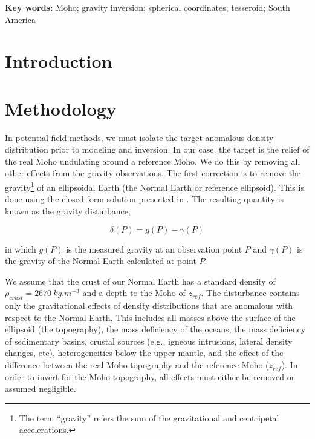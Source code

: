 \documentclass[extra]{gji}
\title[]{\Title}
\author[]{
    Leonardo Uieda$^{1,2}$,
    Valéria C. F. Barbosa$^{2}$
    \\
    $^1$Universidade do Estado do Rio de Janeiro, Rio de Janeiro, Brazil.
    e-mail: leo@leouieda.com
    \\
    $^2$Observatório Nacional, Rio de Janeiro, Brazil.
}
\newcommand{\Keywords}{
        Moho;
        gravity inversion;
        spherical coordinates;
        tesseroid;
        South America
}
\begin{document}
\maketitle


\begin{abstract}
\end{abstract}

\noindent\textbf{Key words:} \Keywords


\section{Introduction}


\section{Methodology}

In potential field methods,
we must isolate the target anomalous density distribution prior to modeling and
inversion.
In our case, the target is the relief of the real Moho undulating around a
reference Moho.
We do this by removing all other effects from the gravity observations.
The first correction is to remove the
gravity\footnote{The term ``gravity'' refers the sum of the gravitational and
centripetal accelerations.}
of an ellipsoidal Earth (the Normal Earth or reference ellipsoid).
This is done using the closed-form solution presented in
\citet{li_ellipsoid_2001}.
The resulting quantity is known as the gravity disturbance,

\begin{equation}
    \delta(P) = g(P) - \gamma(P)
\end{equation}

\noindent in which $g(P)$ is the measured gravity at an observation point $P$
and $\gamma(P)$ is the gravity of the Normal Earth
calculated at point $P$.

We assume that the crust of our Normal Earth has a standard density of
$\rho_{crust} = 2670\ kg.m^{-3}$ and a depth to the Moho of $z_{ref}$.
The disturbance contains only the gravitational effects of density
distributions that are anomalous with respect to the Normal Earth.
This includes all masses above the surface of the ellipsoid (the topography),
the mass deficiency of the oceans,
the mass deficiency of sedimentary basins,
crustal sources (e.g., igneous intrusions, lateral density changes, etc),
heterogeneities below the upper mantle,
and
the effect of the difference between the real Moho
topography and the reference Moho ($z_{ref}$).
In order to invert for the Moho topography, all effects must either be removed
or assumed negligible.
\end{document}
